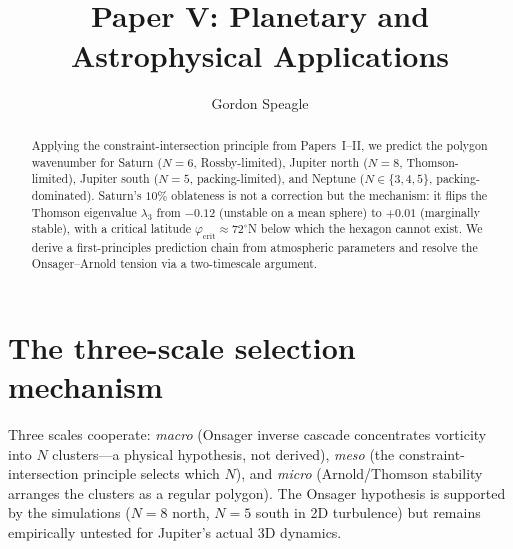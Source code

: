 







\title{\seriestitle\\[6pt]\large Paper V: Planetary and Astrophysical Applications}
\author{Gordon Speagle}
\date{}


\maketitle

\begin{abstract}
Applying the constraint-intersection principle from Papers~I--II, we predict the polygon wavenumber for Saturn ($N=6$, Rossby-limited), Jupiter north ($N=8$, Thomson-limited), Jupiter south ($N=5$, packing-limited), and Neptune ($N \in \{3,4,5\}$, packing-dominated). Saturn's $10\%$ oblateness is not a correction but the mechanism: it flips the Thomson eigenvalue $\lambda_3$ from $-0.12$ (unstable on a mean sphere) to $+0.01$ (marginally stable), with a critical latitude $\varphi_{\mathrm{crit}} \approx 72^\circ$N below which the hexagon cannot exist. We derive a first-principles prediction chain from atmospheric parameters and resolve the Onsager--Arnold tension via a two-timescale argument.
\end{abstract}

\label{part:planets}

\section{The three-scale selection mechanism}
\label{sec:three-scale}
\label{sec:two-scale}
\label{sec:extensions}

Three scales cooperate:
\emph{macro} (Onsager inverse cascade concentrates vorticity into
$N$ clusters---a physical hypothesis, not derived),
\emph{meso} (the constraint-intersection principle selects which $N$),
and \emph{micro} (Arnold/Thomson stability arranges the clusters as
a regular polygon).
The Onsager hypothesis is supported by the \citet{Siegelman2022}
simulations ($N = 8$ north, $N = 5$ south in 2D turbulence)
but remains empirically untested for Jupiter's actual 3D dynamics.


